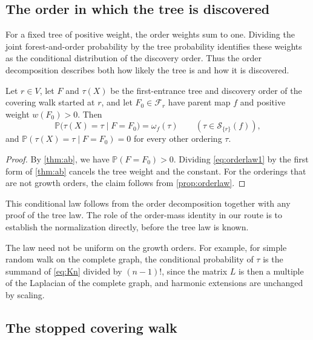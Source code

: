 \documentclass[onefignum,onetabnum]{siamart250211}
\numberwithin{theorem}{section}
\numberwithin{equation}{section}
\newcommand{\Orders}{\mathcal{S}}
\newcommand{\Fset}{\mathcal{F}}
\newcommand{\pr}{\mathbb{P}}
\begin{document}
\subsection{The order in which the tree is discovered}

For a fixed tree of positive weight, the order weights sum to one.
Dividing the joint forest-and-order probability by the tree
probability identifies these weights as the conditional distribution
of the discovery order. Thus the order decomposition describes both
how likely the tree is and how it is discovered.

\begin{theorem}\label{thm:orderlaw}
Let $r\in V$, let $F$ and $\tau(X)$ be the first-entrance tree and
discovery order of the covering walk started at $r$, and let
$F_0\in\Fset_r$ have parent map $f$ and positive weight $w(F_0)>0$. Then
\[
\pr\big(\tau(X)=\tau\mid F=F_0\big)=\omega_f(\tau)
\qquad(\tau\in\Orders_{\{r\}}(f)),
\]
and $\pr(\tau(X)=\tau\mid F=F_0)=0$ for every other ordering $\tau$.
\end{theorem}

\begin{proof}
By \cref{thm:ab}, we have $\pr(F=F_0)>0$. Dividing \eqref{eq:orderlaw1}
by the first form of \cref{thm:ab} cancels the tree weight and the
constant. For the orderings that are not growth orders, the claim
follows from \cref{prop:orderlaw}.
\end{proof}

This conditional law follows from the order decomposition together
with any proof of the tree law. The role of the order-mass identity
in our route is to establish the normalization directly, before the
tree law is known.

\begin{example}\label{rem:nonuniform}
The law need not be uniform on the growth orders. For example, for
simple random walk on the complete graph, the conditional probability
of $\tau$ is the summand of \eqref{eq:Kn} divided by $(n-1)!$, since the
matrix $L$ is then a multiple of the Laplacian of the complete graph,
and harmonic extensions are unchanged by scaling.
\end{example}

\subsection{The stopped covering walk}
\end{document}
